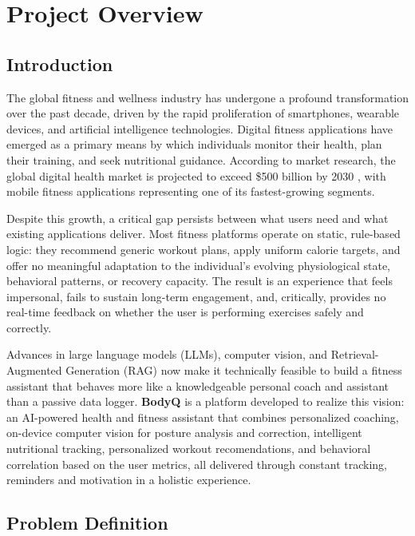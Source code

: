 
\chapter{Project Overview}

\section{Introduction}
The global fitness and wellness industry has undergone a profound transformation over the past decade, driven by the rapid proliferation of smartphones, wearable devices, and artificial intelligence technologies. Digital fitness applications have emerged as a primary means by which individuals monitor their health, plan their training, and seek nutritional guidance. According to market research, the global digital health market is projected to exceed \$500 billion by 2030 \cite{marketsandmarkets2023}, with mobile fitness applications representing one of its fastest-growing segments.

Despite this growth, a critical gap persists between what users need and what existing applications deliver. Most fitness platforms operate on static, rule-based logic: they recommend generic workout plans, apply uniform calorie targets, and offer no meaningful adaptation to the individual's evolving physiological state, behavioral patterns, or recovery capacity. The result is an experience that feels impersonal, fails to sustain long-term engagement, and, critically, provides no real-time feedback on whether the user is performing exercises safely and correctly.

Advances in large language models (LLMs), computer vision, and Retrieval-Augmented Generation (RAG) now make it technically feasible to build a fitness assistant that behaves more like a knowledgeable personal coach and assistant than a passive data logger.
\textbf{BodyQ} is a platform developed to realize this vision: an AI-powered health and fitness assistant that combines personalized coaching, on-device computer vision for posture analysis and correction, intelligent nutritional tracking, personalized workout recomendations, and behavioral correlation based on the user metrics, all delivered through constant tracking, reminders and motivation in a holistic experience.

\section{Problem Definition}

